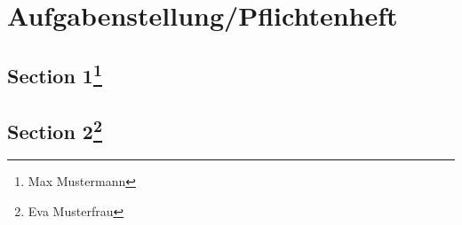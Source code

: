 

\chapter{Aufgabenstellung/Pflichtenheft}


\section[Section 1]{Section 1\protect\footnote{Max Mustermann}}



\section[Section 2]{Section 2\protect\footnote{Eva Musterfrau}}
